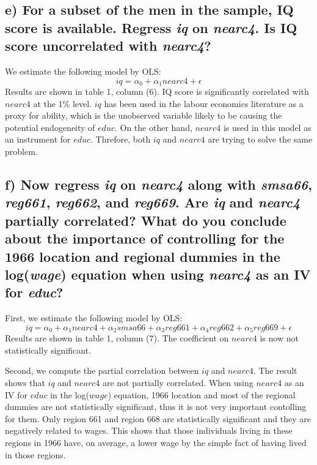 \documentclass[a4paper, 12pt, twoside]{article}
\begin{document}
\subsection*{e) For a subset of the men in the sample, IQ score is available. Regress \textit{iq} on \textit{nearc4}. Is IQ score uncorrelated with \textit{nearc4}?}

We estimate the following model by OLS:
\begin{equation*}
iq=\alpha_0+\alpha{_1}nearc4+\epsilon
\end{equation*}
Results are shown in table 1, column (6). IQ score is significantly correlated with $nearc4$ at the 1\% level. $iq$ has been used in the labour economics literature as a proxy for ability, which is the unobserved variable likely to be causing the potential endogeneity of $educ$. On the other hand, $nearc4$ is used in this model as an instrument for $educ$. Threfore, both $iq$ and $nearc4$ are trying to solve the same problem.
\par\vspace{\baselineskip}

\subsection*{f) Now regress \textit{iq} on \textit{nearc4} along with \textit{smsa66}, \textit{reg661}, \textit{reg662}, and \textit{reg669}. Are \textit{iq} and \textit{nearc4} partially correlated? What do you conclude about the importance of controlling for the 1966 location and regional dummies in the log(\textit{wage}) equation when using \textit{nearc4} as an IV for \textit{educ}?}

First, we estimate the following model by OLS:
\begin{equation*}
iq=\alpha_0 + \alpha{_1}nearc4  + \alpha{_2}smsa66 + \alpha{_3}reg661 + \alpha{_4}reg662 + \alpha{_5}reg669 + \epsilon
\end{equation*}
Results are shown in table 1, column (7). The coefficient on $nearc4$ is now not statistically significant.  
\par\vspace{\baselineskip}
Second, we compute the partial correlation between $iq$ and $nearc4$. The result shows that $iq$ and $nearc4$ are not partially correlated. When using $nearc4$ as an IV for $educ$ in the log($wage$) equation, 1966 location and most of the regional dummies are not statistically significant, thus it is not very important contolling for them. Only region 661 and region 668 are statistically significant and they are negatively related to wages. This shows that those individuals living in these regions in 1966 have, on average, a lower wage by the simple fact of having lived in those regions.
\end{document}
